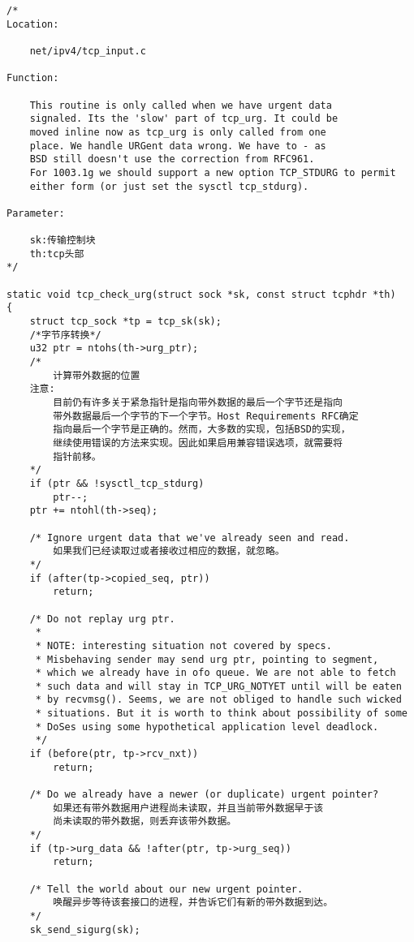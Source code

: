 \begin{verbatim}
/*
Location:

	net/ipv4/tcp_input.c

Function:

	This routine is only called when we have urgent data
	signaled. Its the 'slow' part of tcp_urg. It could be
	moved inline now as tcp_urg is only called from one
	place. We handle URGent data wrong. We have to - as
	BSD still doesn't use the correction from RFC961.
	For 1003.1g we should support a new option TCP_STDURG to permit
	either form (or just set the sysctl tcp_stdurg).

Parameter:

	sk:传输控制块
	th:tcp头部
*/

static void tcp_check_urg(struct sock *sk, const struct tcphdr *th)
{
	struct tcp_sock *tp = tcp_sk(sk);
	/*字节序转换*/
	u32 ptr = ntohs(th->urg_ptr);
	/*
		计算带外数据的位置
	注意:
		目前仍有许多关于紧急指针是指向带外数据的最后一个字节还是指向
		带外数据最后一个字节的下一个字节。Host Requirements RFC确定
		指向最后一个字节是正确的。然而，大多数的实现，包括BSD的实现，
		继续使用错误的方法来实现。因此如果启用兼容错误选项，就需要将
		指针前移。
	*/
	if (ptr && !sysctl_tcp_stdurg)
		ptr--;
	ptr += ntohl(th->seq);

	/* Ignore urgent data that we've already seen and read. 
		如果我们已经读取过或者接收过相应的数据，就忽略。
	*/
	if (after(tp->copied_seq, ptr))
		return;

	/* Do not replay urg ptr.
	 *
	 * NOTE: interesting situation not covered by specs.
	 * Misbehaving sender may send urg ptr, pointing to segment,
	 * which we already have in ofo queue. We are not able to fetch
	 * such data and will stay in TCP_URG_NOTYET until will be eaten
	 * by recvmsg(). Seems, we are not obliged to handle such wicked
	 * situations. But it is worth to think about possibility of some
	 * DoSes using some hypothetical application level deadlock.
	 */
	if (before(ptr, tp->rcv_nxt))
		return;

	/* Do we already have a newer (or duplicate) urgent pointer? 
		如果还有带外数据用户进程尚未读取，并且当前带外数据早于该
		尚未读取的带外数据，则丢弃该带外数据。
	*/
	if (tp->urg_data && !after(ptr, tp->urg_seq))
		return;

	/* Tell the world about our new urgent pointer. 
		唤醒异步等待该套接口的进程，并告诉它们有新的带外数据到达。
	*/
	sk_send_sigurg(sk);


\end{verbatim}
